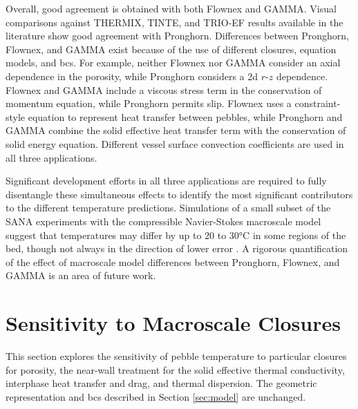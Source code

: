 Overall, good agreement is obtained with both Flownex and GAMMA. Visual comparisons against THERMIX, TINTE, and TRIO-EF results available in the literature \cite{tecdoc1163} show good agreement with Pronghorn. Differences between Pronghorn, Flownex, and GAMMA exist because of the use of different closures, equation models, and \glspl{bc}. For example, neither Flownex nor GAMMA consider an axial dependence in the porosity, while Pronghorn considers a \gls{2d} \(r\)-\(z\) dependence. Flownex and GAMMA include a viscous stress term in the conservation of momentum equation, while Pronghorn permits slip. Flownex uses a constraint-style equation to represent heat transfer between pebbles, while Pronghorn and GAMMA combine the solid effective heat transfer term with the conservation of solid energy equation. Different vessel surface convection coefficients are used in all three applications.

Significant development efforts in all three applications are required to fully disentangle these simultaneous effects to identify the most significant contributors to the different temperature predictions. Simulations of a small subset of the SANA experiments with the compressible Navier-Stokes macroscale model suggest that temperatures may differ by up to 20 to 30\si{\celsius} in some regions of the bed, though not always in the direction of lower error \cite{schunert_phr}. A rigorous quantification of the effect of macroscale model differences between Pronghorn, Flownex, and GAMMA is an area of future work. 

\section{Sensitivity to Macroscale Closures}
\label{sec:sensitivity}

This section explores the sensitivity of pebble temperature to particular closures for porosity, the near-wall treatment for the solid effective thermal conductivity, interphase heat transfer and drag, and thermal dispersion. The geometric representation and \glspl{bc} described in Section \ref{sec:model} are unchanged.

